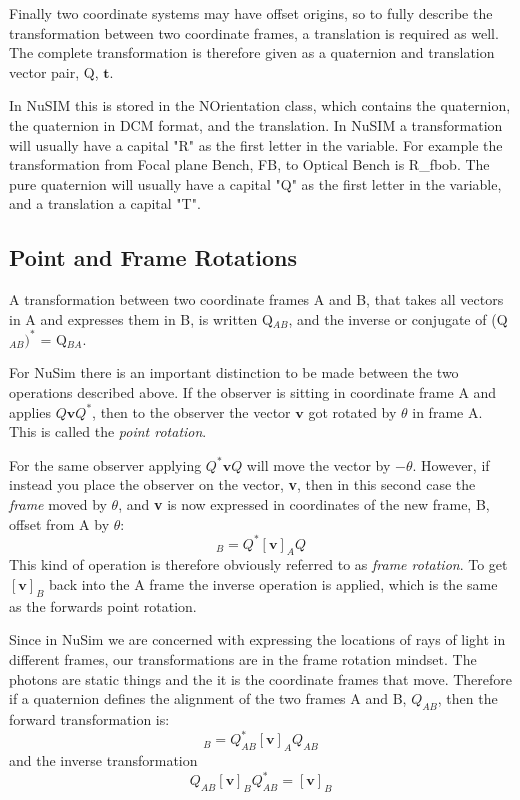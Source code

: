 Finally two coordinate systems may have offset origins, so to fully describe the transformation between two coordinate frames, a translation is required as well. The complete transformation is therefore given as a quaternion and translation vector pair, Q, $\mathbf{t}$. 

In NuSIM this is stored in the NOrientation class, which contains the quaternion, the quaternion in DCM format, and the translation. In NuSIM a transformation will usually have a capital "R" as the first letter in the variable. For example the transformation from Focal plane Bench, FB, to Optical Bench is R\_fbob. The pure quaternion will usually have a capital "Q" as the first letter in the variable, and a translation a capital "T".

\subsection{Point and Frame Rotations}
A transformation between two coordinate frames A and B, that takes all vectors in A and expresses them in B, is written Q$_{AB}$, and the  inverse or conjugate of (Q$_{AB})^*$ = Q$_{BA}$.

For NuSim there is an important distinction to be made between the two operations described above. If the observer is sitting in coordinate frame A and applies $Q\mathbf{v}Q^*$, then to the observer the vector $\mathbf{v}$ got rotated by $\theta$ in frame A. This is called the \textit{point rotation}. 

For the same observer applying $Q^*\mathbf{v}Q$ will move the vector by $-\theta$. However, if instead you place the observer on the vector, \textbf{v}, then in this second case the \textit{frame} moved by $\theta$, and \textbf{v} is now expressed in coordinates of the new frame, B, offset from A by $\theta$:
\begin{equation}
[\mathbf{v}]_B = Q^*[\mathbf{v}]_AQ
\end{equation}
This kind of operation is therefore obviously referred to as \textit{frame rotation}. To get $[\mathbf{v}]_B$ back into the A frame the inverse operation is applied, which is the same as the forwards point rotation.

Since in NuSim we are concerned with expressing the locations of rays of light in different frames, our transformations are in the frame rotation mindset.  The photons are static things and the it is the coordinate frames that move. Therefore if a quaternion defines the alignment of the two frames A and B, $Q_{AB}$, then the forward transformation is:
\begin{equation}
[\mathbf{v}]_B = Q_{AB}^*[\mathbf{v}]_AQ_{AB}
\end{equation}
and the inverse transformation
\begin{equation}
Q_{AB}[\mathbf{v}]_BQ_{AB}^* = [\mathbf{v}]_B 
\end{equation}

